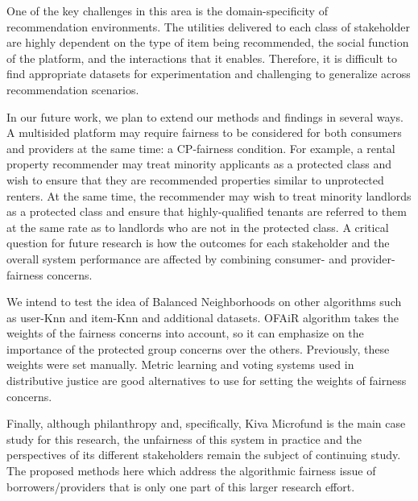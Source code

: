 One of the key challenges in this area is the domain-specificity of recommendation environments. The utilities delivered to each class of stakeholder are highly dependent on the type of item being recommended, the social function of the platform, and the interactions that it enables. Therefore, it is difficult to find appropriate datasets for experimentation and challenging to generalize across recommendation scenarios.

In our future work, we plan to extend our methods and findings in several ways. A multisided platform may require fairness to be considered for both consumers and providers at the same time: a CP-fairness condition. For example, a rental property recommender may treat minority applicants as a protected class and wish to ensure that they are recommended properties similar to unprotected renters. At the same time, the recommender may wish to treat minority landlords as a protected class and ensure that highly-qualified tenants are referred to them at the same rate as to landlords who are not in the protected class. A critical question for future research is how the outcomes for each stakeholder and the overall system performance are affected by combining consumer- and provider-fairness concerns. 

We intend to test the idea of Balanced Neighborhoods on other algorithms such as user-Knn and item-Knn and additional datasets. OFAiR algorithm takes the weights of the fairness concerns into account, so it can emphasize on the importance of the protected group concerns over the others. Previously, these weights were set manually. Metric learning and voting systems used in distributive justice are good alternatives to use for setting the weights of fairness concerns.

Finally, although philanthropy and, specifically, Kiva Microfund is the main case study for this research, the unfairness of this system in practice and the perspectives of its different stakeholders remain the subject of continuing study. The proposed methods here which address the algorithmic fairness issue of borrowers/providers that is only one part of this larger research effort.






